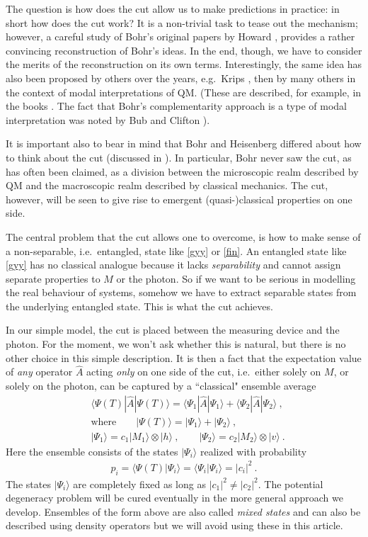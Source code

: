 \documentclass[12pt]{article}
\theoremstyle{plain}
\theoremstyle{definition}
\theoremstyle{remark}
\def\bra#1{\langle #1|}
\def\ket#1{| #1\rangle}
\newcommand{\EQ}[1]{\begin{equation}\begin{split} #1
\end{split}\end{equation}}
\begin{document}
The question is how does the cut allow us to make predictions in practice: in short how does the cut work? It is a non-trivial task to tease out the mechanism; however, a careful study of Bohr's original papers by Howard \cite{Howard2}, provides a rather convincing reconstruction of Bohr's ideas. In the end, though, we have to consider the merits of the reconstruction on its own terms. Interestingly, the same idea has also been proposed by others over the years, e.g.~Krips \cite{Krips:1969tpqm}, 
then by many others in the context of modal interpretations of QM. (These are described, for example, in the books \cite{vanFraassen:1991qmmv,Vermaas:1999puqm}. The fact that Bohr's complementarity approach is a type of modal interpretation was noted by Bub and Clifton \cite{BC}). 

It is important also to bear in mind that Bohr and Heisenberg differed about how to think about the cut (discussed in \cite{SC1,SC2}). In particular, Bohr never saw the cut, as has often been claimed, as a division between the microscopic realm described by QM and the macroscopic realm described by classical mechanics. The cut, however, will be seen to give rise to emergent (quasi-)classical properties on one side.

The central problem that the cut allows one to overcome, is how to make sense of a non-separable, i.e.~entangled, state like \eqref{gyy} or \eqref{fin}.  An entangled state like \eqref{gyy} has no classical analogue because it lacks {\it separability\/} and cannot assign separate properties to $M$ or the photon. So if we want to be serious in modelling the real behaviour of systems, somehow we have to extract separable states from the underlying entangled state. This is what the cut achieves.

In our simple model, the cut is placed between the measuring device and the photon. For the moment, we won't ask whether this is natural, but there is no other choice in this simple description.
It is then a fact that the expectation value of {\it any\/} operator $\hat A$ acting {\it only\/} on one side of the cut, i.e.~either solely on $M$, or solely on the photon, can be captured by a ``classical" ensemble average
\EQ{
&\bra{\Psi(T)}\hat A\ket{\Psi(T)}=\bra{\Psi_1}\hat A\ket{\Psi_1}+\bra{\Psi_2}\hat A\ket{\Psi_2}\ ,\\[3pt]
&\text{where}\qquad\ket{\Psi(T)}=\ket{\Psi_1}+\ket{\Psi_2}\ ,\\[3pt]
&\ket{\Psi_1}=c_1\ket{M_1}\otimes\ket{h}\ ,\qquad\ket{\Psi_2}=c_2\ket{M_2}\otimes\ket{v}\ .
\label{kds}
}
Here the ensemble consists of the states $\ket{\Psi_i}$  realized with probability
\EQ{
p_i=\bra{\Psi(T)}\Psi_i\rangle=\bra{\Psi_i}\Psi_i\rangle=|c_i|^2\ .
}
The states $\ket{\Psi_i}$ are completely fixed as long as $|c_1|^2\neq|c_2|^2$. The potential degeneracy problem will
be cured eventually in the more general approach we develop.
Ensembles of the form above are also called {\it mixed states\/} and can also be described using density operators but we will avoid using these in this article.
\end{document}
